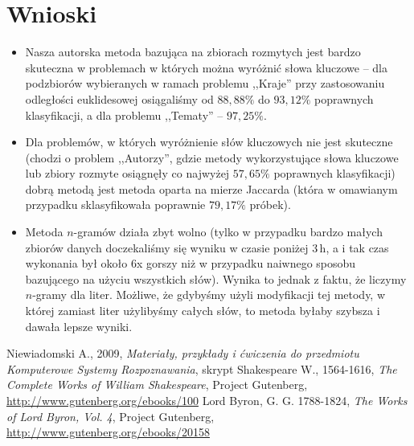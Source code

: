 \documentclass[a4paper]{classrep}
\begin{document}
\section{Wnioski}
\begin{itemize}
\item Nasza autorska metoda bazująca na zbiorach rozmytych jest bardzo skuteczna w problemach w których można wyróżnić słowa kluczowe -- dla podzbiorów wybieranych w ramach problemu ,,Kraje'' przy zastosowaniu odległości euklidesowej osiągaliśmy od \(88,88\%\) do \(93,12\%\) poprawnych klasyfikacji, a dla problemu ,,Tematy'' -- \(97,25\%\).
\item Dla problemów, w których wyróżnienie słów kluczowych nie jest skuteczne (chodzi o problem ,,Autorzy'', gdzie metody wykorzystujące słowa kluczowe lub zbiory rozmyte osiągnęły co najwyżej \(57,65\%\) poprawnych klasyfikacji) dobrą metodą jest metoda oparta na mierze Jaccarda (która w omawianym przypadku sklasyfikowała poprawnie \(79,17\%\) próbek).
\item Metoda \(n\)-gramów działa zbyt wolno (tylko w przypadku bardzo małych zbiorów danych doczekaliśmy się wyniku w czasie poniżej \(3\,\mbox{h}\), a i tak czas wykonania był około \(6\)x gorszy niż w przypadku naiwnego sposobu bazującego na użyciu wszystkich słów). Wynika to jednak z faktu, że liczymy \(n\)-gramy dla liter. Możliwe, że gdybyśmy użyli modyfikacji tej metody, w której zamiast
liter użylibyśmy całych słów, to metoda byłaby szybsza i dawała lepsze wyniki.
\end{itemize}


\begin{thebibliography}{2}
 Niewiadomski A., 2009, \textit{Materiały, przykłady i ćwiczenia do przedmiotu Komputerowe Systemy Rozpoznawania}, skrypt
 Shakespeare W., 1564-1616, \textit{The Complete Works of William Shakespeare}, Project Gutenberg, \url{http://www.gutenberg.org/ebooks/100}
 Lord Byron, G. G. 1788-1824, \textit{The Works of Lord Byron, Vol. 4}, Project Gutenberg, \url{http://www.gutenberg.org/ebooks/20158}
\end{thebibliography}
\end{document}
